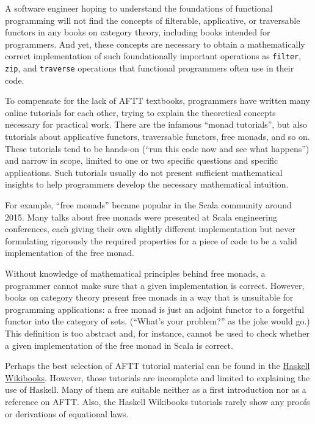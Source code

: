 A software engineer hoping to understand the foundations of functional
programming will not find the concepts of filterable, applicative,
or traversable functors in any books on category theory, including
books intended for programmers. And yet, these concepts are necessary
to obtain a mathematically correct implementation of such foundationally
important operations as \lstinline!filter!, \lstinline!zip!, and
\lstinline!traverse! \textendash{} operations that functional programmers
often use in their code.

To compensate for the lack of AFTT textbooks, programmers have written
many online tutorials for each other, trying to explain the theoretical
concepts necessary for practical work. There are the infamous ``monad
tutorials'', but also tutorials about applicative functors, traversable
functors, free monads, and so on. These tutorials tend to be hands-on
(``run this code now and see what happens'') and narrow in scope,
limited to one or two specific questions and specific applications.
Such tutorials usually do not present sufficient mathematical insights
to help programmers develop the necessary mathematical intuition.

For example, ``free monads'' became popular in the Scala community
around 2015. Many talks about free monads were presented at Scala
engineering conferences, each giving their own slightly different
implementation but never formulating rigorously the required properties
for a piece of code to be a valid implementation of the free monad.

Without knowledge of mathematical principles behind free monads, a
programmer cannot make sure that a given implementation is correct.
However, books on category theory present free monads in a way that
is unsuitable for programming applications: a free monad is just an
adjoint functor to a forgetful functor into the category of sets.
(``What's your problem?'' as the joke would go.) This definition
is too abstract and, for instance, cannot be used to check whether
a given implementation of the free monad in Scala is correct.

Perhaps the best selection of AFTT tutorial material can be found
in the \href{https://en.wikibooks.org/wiki/Haskell}{Haskell Wikibooks}.
However, those tutorials are incomplete and limited to explaining
the use of Haskell. Many of them are suitable neither as a first introduction
nor as a reference on AFTT. Also, the Haskell Wikibooks tutorials
rarely show any proofs or derivations of equational laws.

